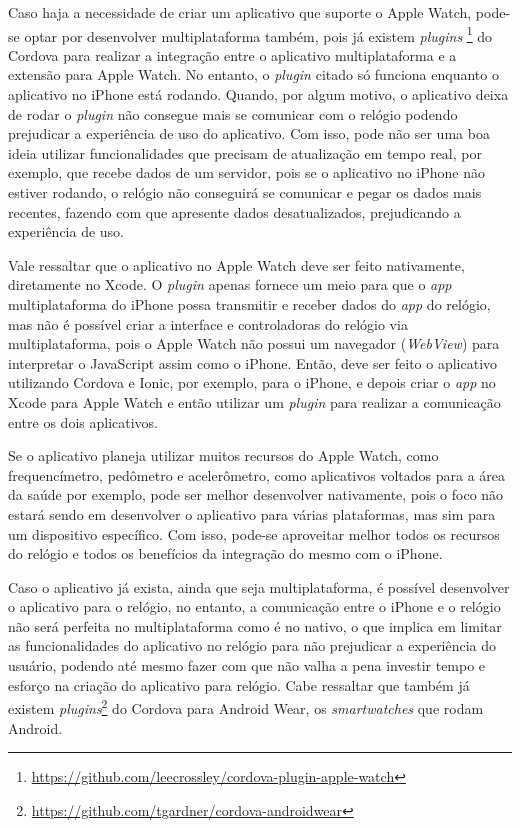 Caso haja a necessidade de criar um aplicativo que suporte o Apple Watch, pode-se optar por desenvolver multiplataforma também, pois já existem \textit{plugins}
\footnote{\url{https://github.com/leecrossley/cordova-plugin-apple-watch}} do Cordova para realizar a integração entre o aplicativo multiplataforma e a extensão para Apple Watch. No entanto, o \textit{plugin} 
citado só funciona enquanto o aplicativo no iPhone está rodando. Quando, por algum motivo, o aplicativo deixa de rodar o \textit{plugin} não consegue mais se comunicar com o relógio podendo prejudicar a experiência 
de uso do aplicativo. Com isso, pode não ser uma boa ideia utilizar funcionalidades que precisam de atualização em tempo real, por exemplo, que recebe dados de um servidor, pois se o aplicativo no iPhone não 
estiver rodando, o relógio não conseguirá se comunicar e pegar os dados mais recentes, fazendo com 
que apresente dados desatualizados, prejudicando a experiência de uso.

Vale ressaltar que o aplicativo no Apple Watch deve ser feito nativamente, diretamente no Xcode. O \textit{plugin} apenas fornece um meio para que o \textit{app} multiplataforma do iPhone possa transmitir e receber 
dados do \textit{app} do relógio, mas não é possível criar a interface e controladoras do relógio via multiplataforma, pois o Apple Watch não possui um navegador (\textit{WebView}) para interpretar o JavaScript assim 
como o iPhone. Então, deve ser feito o aplicativo utilizando Cordova e Ionic, por exemplo, para o iPhone, e depois criar o \textit{app} no Xcode para Apple Watch e então utilizar um \textit{plugin} para realizar a 
comunicação entre os dois aplicativos.  

Se o aplicativo planeja utilizar muitos recursos do Apple Watch, como frequencímetro, pedômetro e acelerômetro, como aplicativos voltados para a área da saúde por exemplo, pode ser melhor desenvolver nativamente,
pois o foco não estará sendo em desenvolver o aplicativo para várias plataformas, mas sim para um dispositivo específico. Com isso, pode-se aproveitar melhor todos os recursos do relógio e todos os benefícios da integração
do mesmo com o iPhone.

Caso o aplicativo já exista, ainda que seja multiplataforma, é possível desenvolver o aplicativo para o relógio, no entanto, a comunicação entre o iPhone e o relógio não será perfeita no multiplataforma como é no nativo, 
o que implica em limitar as funcionalidades do aplicativo no relógio para não prejudicar a experiência do usuário, podendo até mesmo fazer com que não valha a pena investir tempo e esforço na criação do aplicativo para
relógio. Cabe ressaltar que também já existem \textit{plugins}\footnote{\url{https://github.com/tgardner/cordova-androidwear}} do Cordova para Android Wear, os \textit{smartwatches} que rodam Android.

